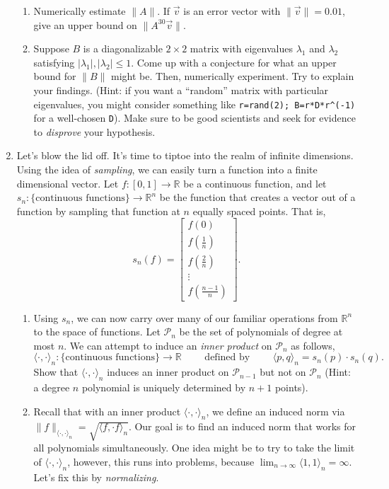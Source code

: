 \documentclass[letter]{article}
\newcommand{\R}{\mathbb{R}}
\newcommand{\mat}[1]{\begin{bmatrix}#1\end{bmatrix}}
\begin{document}
\begin{enumerate}
\begin{enumerate}
				\item Numerically estimate $\|A\|$. 
					If $\vec v$ is an error vector with $\|\vec v\|=0.01$, give an
					upper bound on $\|A^{30}\vec v\|$.
				\item Suppose $B$ is a diagonalizable $2\times 2$ matrix with eigenvalues
					$\lambda_1$ and $\lambda_2$ satisfying $|\lambda_1|,|\lambda_2|\leq 1$.
					Come up with a conjecture for what an upper bound for $\|B\|$ might be.
					Then, numerically experiment.  Try to explain your findings.  (Hint:
					if you want a ``random'' matrix with particular eigenvalues,
					you might consider something like {\tt r=rand(2); B=r*D*r\textasciicircum(-1)}
					for a well-chosen {\tt D}).  Make sure to be good scientists and
					seek for evidence to \emph{disprove} your hypothesis. 
			\end{enumerate}
		\item {\sc Let's blow the lid off}.  It's time to tiptoe into the realm of infinite
			dimensions.  Using the idea of \emph{sampling}, we can easily turn a function
					into a finite dimensional vector.  Let $f:[0,1]\to\R$ be a continuous
					function, and let $s_n:\{\text{continuous functions}\}\to\R^n$
					be the function that creates a vector out of a function by sampling
					that function at $n$ equally spaced points.  That is,
					\[
						s_n(f) = \mat{f(0)\\f(\frac{1}{n})\\f(\frac{2}{n})\\\vdots\\f(\frac{n-1}{n})}.
					\]
			\begin{enumerate}
				\item Using $s_n$, we can now carry over many of our familiar operations from $\R^n$ to 
					the space of functions.  Let $\mathcal P_n$ be the set of polynomials of degree at most $n$.
					We can attempt to induce an \emph{inner product} on $\mathcal P_n$ as follows,
					\[
						\langle\cdot,\cdot\rangle_n:\{\text{continuous functions}\}\to \R\qquad\text{ defined by }\qquad
						\langle p,q\rangle_n = s_n(p)\cdot s_n(q).
					\]
					Show that $\langle \cdot,\cdot\rangle_n$ induces an inner product on $\mathcal P_{n-1}$ but
					not on $\mathcal P_n$ (Hint: a degree $n$ polynomial is uniquely determined by $n+1$ points).
				\item Recall that with an inner product $\langle\cdot,\cdot\rangle_n$, we define an induced norm
					via $\|f\|_{\langle\cdot,\cdot\rangle_n}=\sqrt{\langle f,\cdot f\rangle_n}$.  Our goal
					is to find an induced norm that works for all polynomials simultaneously.  One idea might
					be to try to take the limit of $\langle\cdot,\cdot\rangle_n$, however, this runs into problems,
					because $\lim_{n\to\infty} \langle 1,1\rangle_n=\infty$.  Let's fix this by \emph{normalizing}.


\end{enumerate}
\end{enumerate}
\end{document}

